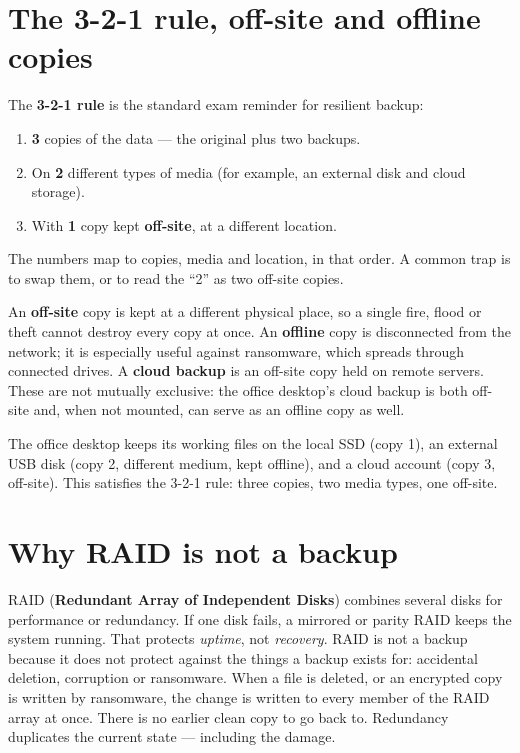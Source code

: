 \section{The 3-2-1 rule, off-site and offline copies}
The \textbf{3-2-1 rule} is the standard exam reminder for resilient backup:
\begin{enumerate}
  \item \textbf{3} copies of the data --- the original plus two backups.
  \item On \textbf{2} different types of media (for example, an external disk
    and cloud storage).
  \item With \textbf{1} copy kept \textbf{off-site}, at a different location.
\end{enumerate}
The numbers map to copies, media and location, in that order. A common trap
is to swap them, or to read the ``2'' as two off-site copies.

An \textbf{off-site} copy is kept at a different physical place, so a single
fire, flood or theft cannot destroy every copy at once. An \textbf{offline}
copy is disconnected from the network; it is especially useful against
ransomware, which spreads through connected drives. A \textbf{cloud backup}
is an off-site copy held on remote servers. These are not mutually exclusive:
the office desktop's cloud backup is both off-site and, when not mounted, can
serve as an offline copy as well.

\begin{example}
The office desktop keeps its working files on the local SSD (copy 1), an
external USB disk (copy 2, different medium, kept offline), and a cloud
account (copy 3, off-site). This satisfies the 3-2-1 rule: three copies, two
media types, one off-site.
\end{example}

\section{Why RAID is not a backup}
RAID (\textbf{Redundant Array of Independent Disks}) combines several disks
for performance or redundancy. If one disk fails, a mirrored or parity RAID
keeps the system running. That protects \emph{uptime}, not \emph{recovery}.
RAID is not a backup because it does not protect against the things a backup
exists for: accidental deletion, corruption or ransomware. When a file is
deleted, or an encrypted copy is written by ransomware, the change is written
to every member of the RAID array at once. There is no earlier clean copy to
go back to. Redundancy duplicates the current state --- including the damage.

